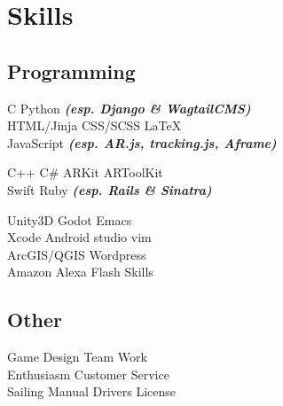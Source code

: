\documentclass[a4paper]{deedy-resume-twopage} %
\begin{document}
\begin{minipage}[t]{0.33\textwidth}

  \sectionspace
  \section{Skills}

  \subsection{Programming}
  \textbullet{} C \textbullet{} Python {\footnotesize \textit{\textbf{(esp. Django \& WagtailCMS)}}} \\
  \textbullet{} HTML/Jinja \textbullet{} CSS/SCSS \textbullet{} \LaTeX\ \\
   \textbullet{} JavaScript {\footnotesize \textit{\textbf{(esp. AR.js, tracking.js, Aframe)}}} \\

  \sectionspace

  \textbullet{} C++ \textbullet{} C\# \textbullet{} ARKit \textbullet{} ARToolKit \\
  \textbullet{} Swift \textbullet{} Ruby {\footnotesize \textit{\textbf{(esp. Rails \& Sinatra)}}} \\

  \sectionspace

  \textbullet{} Unity3D \textbullet{} Godot \textbullet{} Emacs \\
  \textbullet{} Xcode \textbullet{} Android studio \textbullet{} vim \\
  \textbullet{} ArcGIS/QGIS \textbullet{} Wordpress \\
  \textbullet{} Amazon Alexa Flash Skills\\

  \sectionspace

  \subsection{Other}
  Game Design \textbullet{} Team Work \\
  \textbullet{} Enthusiasm \textbullet{} Customer Service \\
  \textbullet{} Sailing \textbullet{} Manual Drivers License\\

  \sectionspace


\end{minipage}
\end{document}
